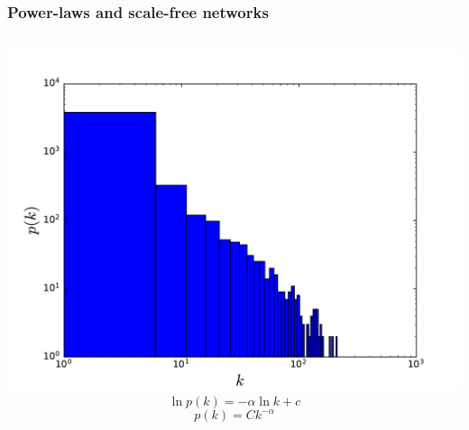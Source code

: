 \documentclass{beamer}
\begin{document}
\begin{frame}
    \frametitle{Power-laws and scale-free networks}
    \begin{columns}
        \centering
        \includegraphics[width=\columnwidth]{deg_distri_global_airport_log.pdf}
        \centering
        $$\ln p(k) = -\alpha \ln k + c$$ 
        $$p(k) = Ck^{-\alpha}$$

    \end{columns}
\end{frame}
\end{document}
